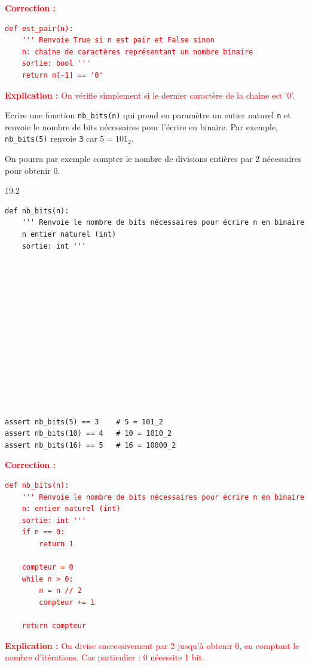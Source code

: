 \documentclass[a4paper,10pt]{report}
\def\ptsexoI{2}
\def\ptsexoJ{2}
\begin{document}
\textcolor{red}{
\textbf{Correction :}
\begin{verbatim}
def est_pair(n):
    ''' Renvoie True si n est pair et False sinon
    n: chaîne de caractères représentant un nombre binaire
    sortie: bool '''
    return n[-1] == '0'
\end{verbatim}
\textbf{Explication :} On vérifie simplement si le dernier caractère de la chaîne est '0'.
}

\medskip

\exods{\ptsexoI}

Ecrire une fonction \verb|nb_bits(n)| qui prend en paramètre un entier naturel \verb|n| et renvoie le nombre de bits nécessaires pour l'écrire en binaire. Par exemple, \verb|nb_bits(5)| renvoie \verb|3| car $5 = 101_2$.

On pourra par exemple compter le nombre de divisions entières par 2 nécessaires pour obtenir 0.
    \begin{answer}{1}{9.2} 
\begin{verbatim}
def nb_bits(n):
    ''' Renvoie le nombre de bits nécessaires pour écrire n en binaire 
    n entier naturel (int)
    sortie: int '''














assert nb_bits(5) == 3    # 5 = 101_2
assert nb_bits(10) == 4   # 10 = 1010_2 
assert nb_bits(16) == 5   # 16 = 10000_2
    \end{verbatim}

    \end{answer}

\textcolor{red}{
\textbf{Correction :}
\begin{verbatim}
def nb_bits(n):
    ''' Renvoie le nombre de bits nécessaires pour écrire n en binaire
    n: entier naturel (int)
    sortie: int '''
    if n == 0:
        return 1
    
    compteur = 0
    while n > 0:
        n = n // 2
        compteur += 1
    
    return compteur
\end{verbatim}
\textbf{Explication :} On divise successivement par 2 jusqu'à obtenir 0, en comptant le nombre d'itérations. Cas particulier : 0 nécessite 1 bit.
}

    \pagebreak

    \exods{\ptsexoJ}
\end{document}
